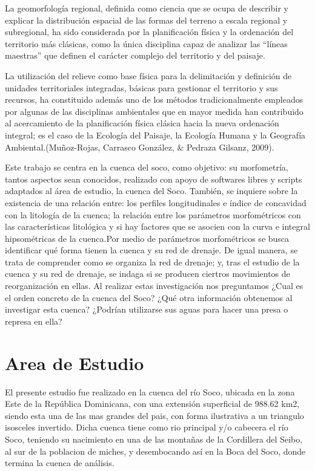 \documentclass[11pt,]{article}
\begin{document}
La geomorfología regional, definida como ciencia que se ocupa de
describir y explicar la distribución espacial de las formas del terreno
a escala regional y subregional, ha sido considerada por la
planificación física y la ordenación del territorio más clásicas, como
la única disciplina capaz de analizar las ``líneas maestras'' que
definen el carácter complejo del territorio y del paisaje.

La utilización del relieve como base física para la delimitación y
definición de unidades territoriales integradas, básicas para gestionar
el territorio y sus recursos, ha constituido además uno de los métodos
tradicionalmente empleados por algunas de las disciplinas ambientales
que en mayor medida han contribuido al acercamiento de la planificación
física clásica hacia la nueva ordenación integral; es el caso de la
Ecología del Paisaje, la Ecología Humana y la Geografía
Ambiental.(Muñoz-Rojas, Carrasco González, \& Pedraza Gilsanz, 2009).

Este trabajo se centra en la cuenca del soco, como objetivo: su
morfometría, tantos aspectos sean conocidos, realizado con apoyo de
softwares libres y scripts adaptados al área de estudio, la cuenca del
Soco. También, se inquiere sobre la existencia de una relación entre:
los perfiles longitudinales e índice de concavidad con la litología de
la cuenca; la relación entre los parámetros morfométricos con las
características litológica y si hay factores que se asocien con la curva
e integral hipsométricas de la cuenca.Por medio de parámetros
morfométricos se busca identificar qué forma tienen la cuenca y su red
de drenaje. De igual manera, se trata de comprender como se organiza la
red de drenaje; y, tras el estudio de la cuenca y su red de drenaje, se
indaga si se producen ciertros movimientos de reorganización en ellas.
Al realizar estas investigación nos preguntamos ¿Cual es el orden
concreto de la cuenca del Soco? ¿Qué otra información obtenemos al
investigar esta cuenca? ¿Podrían utilizarse sus aguas para hacer una
presa o represa en ella?

\section{Area de Estudio}\label{area-de-estudio}

El presente estudio fue realizado en la cuenca del río Soco, ubicada en
la zona Este de la República Dominicana, con una extensión superficial
de 988.62 km2, siendo esta una de las mas grandes del pais, con forma
ilustrativa a un triangulo isosceles invertido. Dicha cuenca tiene como
rio principal y/o cabecera el río Soco, teniendo su nacimiento en una de
las montañas de la Cordillera del Seibo, al sur de la poblacion de
miches, y desembocando así en la Boca del Soco, donde termina la cuenca
de análisis.
\end{document}
